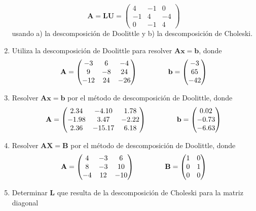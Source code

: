\documentclass[12pt]{article}
\numberwithin{equation}{section}
\begin{document}
\begin{enumerate}
\[ \mathbf{A} = \mathbf{LU} =
	\begin{pmatrix}
		4 & -1 & 0 \\
		-1 & 4 & -4 \\
		0 & -1 & 4
	\end{pmatrix} \]
	usando a) la descomposición de Doolittle y b) la descomposición de Choleski.
\item Utiliza la descomposición de Doolittle para resolver $\mathbf{Ax}=\mathbf{b}$, donde
\[  \mathbf{A} =
	\begin{pmatrix}
		-3 & 6 & -4 \\
		9 & -8 & 24 \\
		-12 & 24 & -26 \\
	\end{pmatrix} \hspace{1.5cm}
	\mathbf{b} =	
	\begin{pmatrix}
		-3 \\
		65 \\
		-42
	\end{pmatrix} \]
\item Resolver $\mathbf{Ax} = \mathbf{b}$ por el método de descomposición de Doolittle, donde
\[  \mathbf{A} =
	\begin{pmatrix}
		2.34 & -4.10 & 1.78 \\
		-1.98 & 3.47 & -2.22 \\
		2.36 & -15.17 & 6.18 \\
	\end{pmatrix} \hspace{1.5cm}
	\mathbf{b} =	
	\begin{pmatrix}
		0.02 \\
		-0.73 \\
		-6.63
	\end{pmatrix} \]
\item Resolver $\mathbf{AX} = \mathbf{B}$ por el método de descomposición de Doolittle, donde
\[  \mathbf{A} =
	\begin{pmatrix}
		4 & -3 & 6 \\
		8 & -3 & 10 \\
		-4 & 12 & -10 \\
	\end{pmatrix} \hspace{1.5cm}
	\mathbf{B} =	
	\begin{pmatrix}
		1 & 0 \\
		0 & 1 \\
		0 & 0 
	\end{pmatrix} \]
\item Determinar $\mathbf{L}$ que resulta de la descomposición de Choleski para la matriz diagonal

\end{enumerate}
\end{document}
